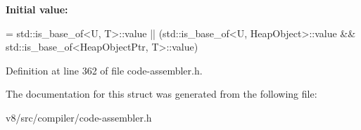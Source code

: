 {\bfseries Initial value\+:}
\begin{DoxyCode}
= std::is\_base\_of<U, T>::value ||
                            (std::is\_base\_of<U, HeapObject>::value &&
                             std::is\_base\_of<HeapObjectPtr, T>::value)
\end{DoxyCode}


Definition at line 362 of file code-\/assembler.\+h.



The documentation for this struct was generated from the following file\+:\begin{DoxyCompactItemize}
\item 
v8/src/compiler/code-\/assembler.\+h\end{DoxyCompactItemize}
